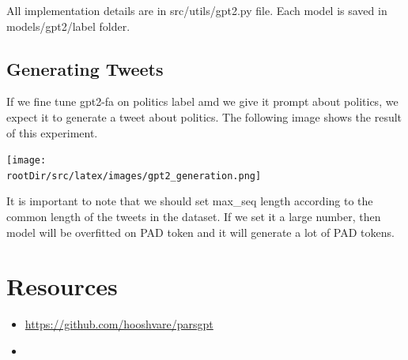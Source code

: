 \documentclass[12pt, letterpaper]{article}
\def\rootDir{../..}
\begin{document}
    \begin{figure}[H]

    \end{figure}
    All implementation details are in src\slash utils\slash gpt2.py file. Each model is saved in models\slash gpt2\slash label folder.

    \subsection{Generating Tweets}\label{sec:generating-tweets}
    If we fine tune gpt2-fa on politics label amd we give it prompt about politics, we expect it to generate a tweet about politics. The following image shows the result of this experiment.
    \begin{center}
        \texttt{[image: \\rootDir/src/latex/images/gpt2\_generation.png]}
    \end{center}
    It is important to note that we should set max\_seq length according to the common length of the tweets in the dataset. If we set it a large number, then model will be overfitted on PAD token and it will generate a lot of PAD tokens.

    \section{Resources}\label{sec:resources}
    \begin{itemize}
        \item \url{https://github.com/hooshvare/parsgpt}
        \item \url{}
    \end{itemize}
\end{document}
